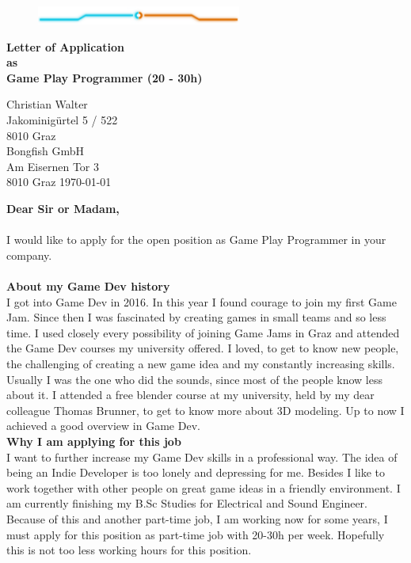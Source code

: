 \documentclass{article}
\newcommand{\myTitle}[1]{{\fontfamily{ffm}\selectfont \textbf{\Huge{#1}} }}
\newcommand{\mySubTitle}[1]{{\fontfamily{ffm}\selectfont \textbf{\large{#1}} }}
\newcommand{\headParam}[1]{{\normalfont \selectfont \textbf{\large{#1}} }}
\begin{document}
\begin{center}
\begin{figure}[h]
    \centering
    \includegraphics[width=0.6\textwidth]{tron_blue_orange_up}
\end{figure}
\myTitle{Letter of Application} \\
\mySubTitle{as \\ Game Play Programmer (20 - 30h)}

\end{center}

\vspace{0.5cm}
Christian Walter \\
Jakominigürtel 5 / 522 \\
8010 Graz \\

\vspace{0.1cm}
Bongfish GmbH \\
Am Eisernen Tor 3 \\
8010 Graz \hfill
\today


\vspace{0.25cm}
\mySubTitle{Dear Sir or Madam,}
\\ \\
I would like to apply for the open position as Game Play Programmer in your company.\\\\
\headParam{About my Game Dev history}
\\
I got into Game Dev in 2016. In this year I found courage to join my first Game Jam. Since then I was fascinated by creating games in small teams and so less time. I used closely every possibility of joining Game Jams in Graz and attended the Game Dev courses my university offered. I loved, to get to know new people, the challenging of creating a new game idea and my constantly increasing skills. Usually I was the one who did the sounds, since most of the people know less about it. I attended a free blender course at my university, held by my dear colleague Thomas Brunner, to get to know more about 3D modeling. Up to now I achieved a good overview in Game Dev.\\

\headParam{Why I am applying for this job}
\\
I want to further increase my Game Dev skills in a professional way. The idea of being an Indie Developer is too lonely and depressing for me. Besides I like to work together with other people on great game ideas in a friendly environment. I am currently finishing my B.Sc Studies for Electrical and Sound Engineer. Because of this and another part-time job, I am working now for some years, I must apply for this position as part-time job with 20-30h per week. Hopefully this is not too less working hours for this position. \\
\end{document}
